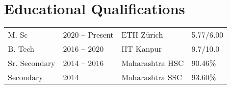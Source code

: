 \section*{Educational Qualifications}
\begin{tabulary}{\textwidth}{L L L L}

\toprule
{} &  &  & \\
\midrule
M. Sc & 2020 -- Present & ETH Zürich & 5.77/6.00\\%
B. Tech & 2016 -- 2020 & IIT Kanpur & 9.7/10.0\\%
Sr. Secondary & 2014 -- 2016 & Maharashtra HSC & 90.46\%\\%
Secondary & 2014 & Maharashtra SSC & 93.60\%\\
\bottomrule

\end{tabulary}
